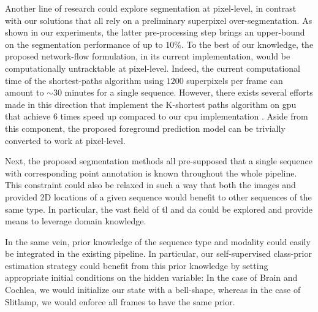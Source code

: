 Another line of research could explore segmentation at pixel-level, in contrast with our solutions that all rely on a preliminary superpixel over-segmentation.
As shown in our experiments, the latter pre-processing step brings an upper-bound on the segmentation performance of up to $10\%$.
To the best of our knowledge, the proposed network-flow formulation, in its current implementation, would be computationally untracktable at pixel-level.
Indeed, the current computational time of the shortest-paths algorithm using $1200$ superpixels per frame can amount to $\sim 30$ minutes for a single sequence.
However, there exists several efforts made in this direction that implement the K-shortest paths algorithm on \gls{gpu} that achieve $6$ times speed up compared to our \gls{cpu} implementation \cite{singh15}.
Aside from this component, the proposed foreground prediction model can be trivially converted to work at pixel-level.

Next, the proposed segmentation methods all pre-supposed that a single sequence with corresponding point annotation is known throughout the whole pipeline.
This constraint could also be relaxed in such a way that both the images and provided 2D locations of a given sequence would benefit to other sequences of the same type.
In particular, the vast field of \gls{tl} and \gls{da} could be explored and provide means to leverage domain knowledge.

In the same vein, prior knowledge of the sequence type and modality could easily be integrated in the existing pipeline.
In particular, our self-supervised class-prior estimation strategy could benefit from this prior knowledge by setting appropriate initial conditions on the hidden variable: In the case of Brain and Cochlea, we would initialize our state with a bell-shape, whereas in the case of Slitlamp, we would enforce all frames to have the same prior.


